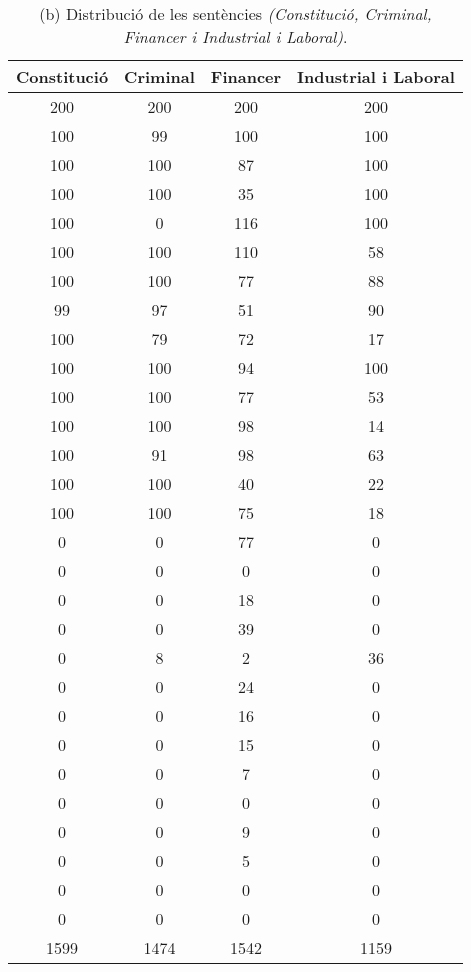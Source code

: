 \begin{table}[H]
\centering
\begin{tabular}{cccc}
  \toprule
  \textbf{Constitució} &
  \textbf{Criminal} &
  \textbf{Financer} &
  \textbf{Industrial i Laboral} \\
  \midrule
200 & 200 & 200 & 200 \\
100 & 99 & 100 & 100 \\
100 & 100 & 87 & 100 \\
100 & 100 & 35 & 100 \\
100 & 0 & 116 & 100 \\
100 & 100 & 110 & 58 \\
100 & 100 & 77 & 88 \\
99 & 97 & 51 & 90 \\
100 & 79 & 72 & 17 \\
100 & 100 & 94 & 100 \\
100 & 100 & 77 & 53 \\
100 & 100 & 98 & 14 \\
100 & 91 & 98 & 63 \\
100 & 100 & 40 & 22 \\
100 & 100 & 75 & 18 \\
0 & 0 & 77 & 0 \\
0 & 0 & 0 & 0 \\
0 & 0 & 18 & 0 \\
0 & 0 & 39 & 0 \\
0 & 8 & 2 & 36 \\
0 & 0 & 24 & 0 \\
0 & 0 & 16 & 0 \\
0 & 0 & 15 & 0 \\
0 & 0 & 7 & 0 \\
0 & 0 & 0 & 0 \\
0 & 0 & 9 & 0 \\
0 & 0 & 5 & 0 \\
0 & 0 & 0 & 0 \\
0 & 0 & 0 & 0 \\
1599 & 1474 & 1542 & 1159 \\
\bottomrule
\end{tabular}
\captionsetup{font=small}
\caption*{(b) Distribució de les sentències \textit{(Constitució, Criminal, Financer i Industrial i Laboral)}.}
\end{table}

\pagebreak
  

